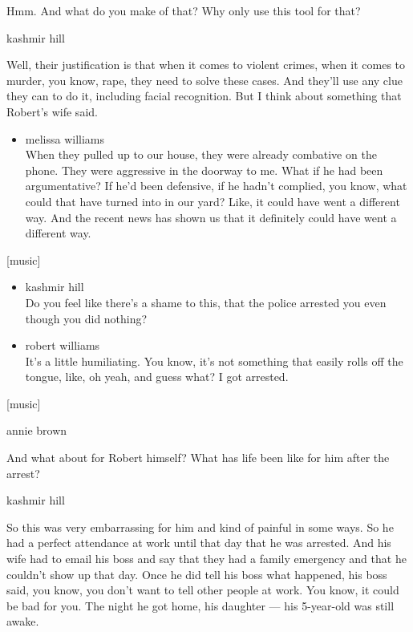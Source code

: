 Hmm. And what do you make of that? Why only use this tool for that?

kashmir hill

Well, their justification is that when it comes to violent crimes, when
it comes to murder, you know, rape, they need to solve these cases. And
they'll use any clue they can to do it, including facial recognition.
But I think about something that Robert's wife said.

\begin{itemize}
\tightlist
\item
  melissa williams\\
  When they pulled up to our house, they were already combative on the
  phone. They were aggressive in the doorway to me. What if he had been
  argumentative? If he'd been defensive, if he hadn't complied, you
  know, what could that have turned into in our yard? Like, it could
  have went a different way. And the recent news has shown us that it
  definitely could have went a different way.
\end{itemize}

{[}music{]}

\begin{itemize}
\item
  kashmir hill\\
  Do you feel like there's a shame to this, that the police arrested you
  even though you did nothing?
\item
  robert williams\\
  It's a little humiliating. You know, it's not something that easily
  rolls off the tongue, like, oh yeah, and guess what? I got arrested.
\end{itemize}

{[}music{]}

annie brown

And what about for Robert himself? What has life been like for him after
the arrest?

kashmir hill

So this was very embarrassing for him and kind of painful in some ways.
So he had a perfect attendance at work until that day that he was
arrested. And his wife had to email his boss and say that they had a
family emergency and that he couldn't show up that day. Once he did tell
his boss what happened, his boss said, you know, you don't want to tell
other people at work. You know, it could be bad for you. The night he
got home, his daughter --- his 5-year-old was still awake.

